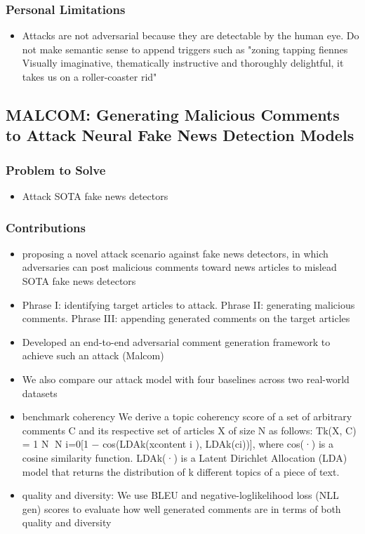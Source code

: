 \documentclass{article}
\begin{document}
\begin{flushleft}
\subsubsection*{Personal Limitations}
\begin{itemize}
    \item Attacks are not adversarial because they are detectable by the human eye. Do not make semantic sense to append triggers such as "zoning tapping fiennes Visually imaginative, thematically instructive and thoroughly delightful, it takes us on a roller-coaster rid"
\end{itemize}



\subsection{MALCOM: Generating Malicious Comments to Attack Neural Fake News Detection Models  \cite{le2020malcom} }
\subsubsection*{Problem to Solve}
\begin{itemize}
    \item Attack SOTA fake news detectors 
\end{itemize}

\subsubsection*{Contributions}
\begin{itemize}
  \item proposing a novel attack scenario against fake news detectors, in which adversaries can post malicious comments toward news articles to mislead SOTA fake news detectors
  \item Phrase I: identifying target articles to attack. Phrase II: generating malicious comments. Phrase III: appending generated
comments on the target articles
  \item Developed an end-to-end adversarial comment generation framework to achieve such an attack (Malcom)
  \item We also compare our attack model with four baselines across two real-world datasets
  \item benchmark coherency We derive a topic coherency score of a set of arbitrary comments C and its respective set of
articles X of size N as follows: Tk(X, C) = 1 N N i=0[1 − cos(LDAk(xcontent i ), LDAk(ci))], where cos(·) is a cosine similarity function. LDAk(·) is a Latent Dirichlet Allocation (LDA) model that returns the distribution of
k different topics of a piece of text.
\item quality and diversity: We use BLEU and negative-loglikelihood loss (NLL gen) scores to evaluate how well
generated comments are in terms of both quality and diversity 
\end{itemize}


\end{flushleft}
\end{document}
